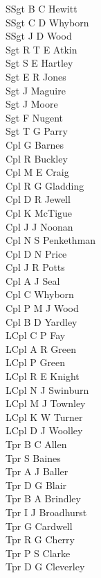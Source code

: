 \begin{multicols}{4}
  \scriptsize
  \noindent
  SSgt B C Hewitt \\
  SSgt C D Whyborn \\
  SSgt J D Wood \\
  Sgt R T E Atkin \\
  Sgt S E Hartley \\
  Sgt E R Jones \\
  Sgt J Maguire \\
  Sgt J Moore \\
  Sgt F Nugent \\
  Sgt T G Parry \\
  Cpl G Barnes \\
  Cpl R Buckley \\
  Cpl M E Craig \\
  Cpl R G Gladding \\
  Cpl D R Jewell \\
  Cpl K McTigue \\
  Cpl J J Noonan \\
  Cpl N S Penkethman \\
  Cpl D N Price \\
  Cpl J R Potts \\
  Cpl A J Seal \\
  Cpl C Whyborn \\
  Cpl P M J Wood \\
  Cpl B D Yardley \\
  LCpl C P Fay \\
  LCpl A R Green \\
  LCpl P Green \\
  LCpl R E Knight \\
  LCpl N J Swinburn \\
  LCpl M J Townley \\
  LCpl K W Turner \\
  LCpl D J Woolley \\
  Tpr B C Allen \\
  Tpr S Baines \\
  Tpr A J Baller \\
  Tpr D G Blair \\
  Tpr B A Brindley \\
  Tpr I J Broadhurst \\
  Tpr G Cardwell \\
  Tpr R G Cherry \\
  Tpr P S Clarke \\
  Tpr D G Cleverley \\

\end{multicols}
